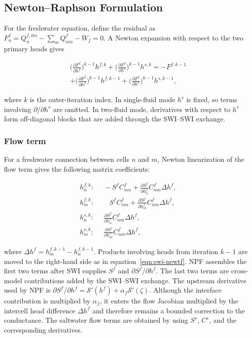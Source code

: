 \subsection{Newton--Raphson Formulation}

For the freshwater equation, define the residual as $F_{n}^{f}=Q_{n}^{f,\mathrm{sto}}-\sum_{m}Q_{nm}^{f}-\dot W_{f}=0$. A Newton expansion with respect to the two primary heads gives

\begin{multline}
\label{eqn:swi-newtf}
\Big(\tfrac{\partial F^{f}}{\partial h^{f}}\Big)^{\!k-1}\!h^{f,k}
+\Big(\tfrac{\partial F^{f}}{\partial h^{s}}\Big)^{\!k-1}\!h^{s,k}
=-F^{f,k-1}\\
+\Big(\tfrac{\partial F^{f}}{\partial h^{f}}\Big)^{\!k-1}\!h^{f,k-1}
+\Big(\tfrac{\partial F^{f}}{\partial h^{s}}\Big)^{\!k-1}\!h^{s,k-1},
\end{multline}

\noindent where $k$ is the outer-iteration index. In single-fluid mode $h^{s}$ is fixed, so terms involving $\partial/\partial h^{s}$ are omitted. In two-fluid mode, derivatives with respect to $h^{s}$ form off-diagonal blocks that are added through the SWI--SWI exchange.

\subsubsection{Flow term}

For a freshwater connection between cells $n$ and $m$, Newton linearization of the flow term gives the following matrix coefficients:

\begin{align}
\label{eqn:swi-fnflow}
h_{n}^{f,k}:&\;\;
-S^{f}C_{nm}^{f}+\frac{\partial S^{f}}{\partial h_{n}^{f}}C_{nm}^{f}\Delta h^{f},\\
h_{m}^{f,k}:&\;\;
\;\;\;S^{f}C_{nm}^{f}+\frac{\partial S^{f}}{\partial h_{m}^{f}}C_{nm}^{f}\Delta h^{f},\\
h_{n}^{s,k}:&\;\;
\frac{\partial S^{f}}{\partial h_{n}^{s}}C_{nm}^{f}\Delta h^{f},\\
h_{m}^{s,k}:&\;\;
\frac{\partial S^{f}}{\partial h_{m}^{s}}C_{nm}^{f}\Delta h^{f},
\end{align}

\noindent where $\Delta h^{f}=h_{m}^{f,k-1}-h_{n}^{f,k-1}$. Products involving heads from iteration $k-1$ are moved to the right-hand side as in equation~\ref{eqn:swi-newtf}. NPF assembles the first two terms after SWI supplies $S^{f}$ and $\partial S^{f}/\partial h^{f}$. The last two terms are cross-model contributions added by the SWI--SWI exchange. The upstream derivative used by NPF is $\partial S^{f}/\partial h^{f}=\mathcal{S}'(h^{f})+\alpha_{f}\mathcal{S}'(\zeta)$. Although the interface contribution is multiplied by $\alpha_{f}$, it enters the flow Jacobian multiplied by the intercell head difference $\Delta h^{f}$ and therefore remains a bounded correction to the conductance. The saltwater flow terms are obtained by using $S^{s}$, $C^{s}$, and the corresponding derivatives.

